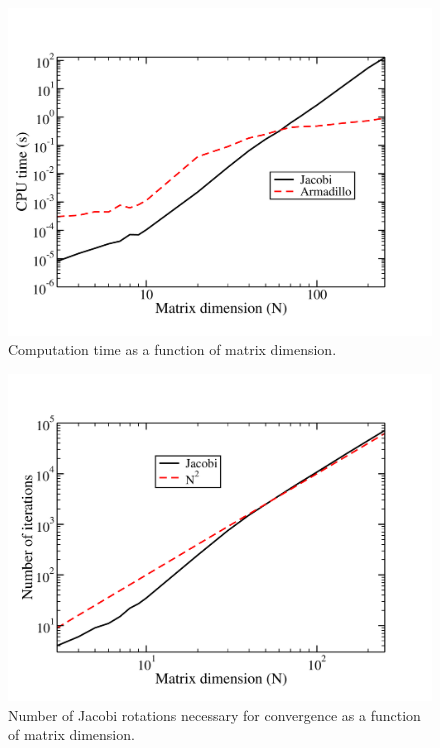 \documentclass[prc,amsmath,twocolumn,superscriptaddress]{revtex4}
\begin{document}
\begin{figure}[b]
\includegraphics[scale=0.32]{N_time2.pdf}
\caption{Computation time as a function of matrix dimension.}
\label{arma}
\end{figure}

\begin{figure}[t]
\includegraphics[scale=0.33]{N_trans.pdf}
\caption{Number of Jacobi rotations necessary for convergence as a function of matrix dimension.}
\label{trans}
\end{figure}
\end{document}
